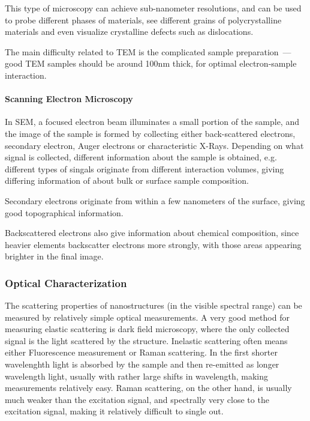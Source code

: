                     This type of microscopy can achieve sub-nanometer resolutions, and can be used to probe different phases of materials,
                see different grains of polycrystalline materials and even visualize crystalline defects such as dislocations.

                    The main difficulty related to TEM is the complicated sample preparation~--- good TEM samples should be around 100nm thick,
                for optimal electron-sample interaction.

            \paragraph{Scanning Electron Microscopy}
                    In SEM, a focused electron beam illuminates a small portion of the sample, and the image of the sample is formed by
                collecting either back-scattered electrons, secondary electron, Auger electrons or characteristic X-Rays. Depending on what
                signal is collected, different information about the sample is obtained, e.g. different types of singals originate from
                different interaction volumes, giving differing information of about bulk or surface sample composition.

                    Secondary electrons originate from within a few nanometers of the surface, giving good topographical information.

                    Backscattered electrons also give information about chemical composition, since heavier elements backscatter electrons
                more strongly, with those areas appearing brighter in the final image.

        \subsubsection{Optical Characterization}
        \label{sec:OpticalCharacterization}

                The scattering properties of nanostructures (in the visible spectral range) can be measured by relatively simple optical
            measurements. A very good method for measuring elastic scattering is dark field microscopy, where the only collected signal
            is the light scattered by the structure. Inelastic scattering often means either Fluorescence measurement or Raman scattering.
            In the first shorter wavelenghth light is absorbed by the sample and then re-emitted as longer wavelength light, usually with
            rather large shifts in wavelength, making measurements relatively easy. Raman scattering, on the other hand, is usually much weaker
            than the excitation signal, and spectrally very close to the excitation signal, making it relatively difficult to single out.

